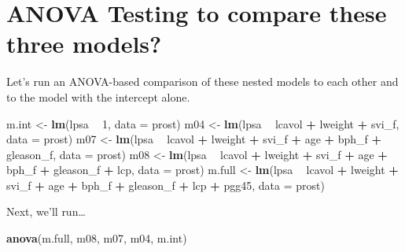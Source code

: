 \documentclass[]{book}
\newenvironment{Shaded}{\begin{snugshade}}{\end{snugshade}}
\newcommand{\KeywordTok}[1]{\textcolor[rgb]{0.13,0.29,0.53}{\textbf{#1}}}
\newcommand{\DataTypeTok}[1]{\textcolor[rgb]{0.13,0.29,0.53}{#1}}
\newcommand{\DecValTok}[1]{\textcolor[rgb]{0.00,0.00,0.81}{#1}}
\newcommand{\StringTok}[1]{\textcolor[rgb]{0.31,0.60,0.02}{#1}}
\newcommand{\OperatorTok}[1]{\textcolor[rgb]{0.81,0.36,0.00}{\textbf{#1}}}
\newcommand{\NormalTok}[1]{#1}
\theoremstyle{definition}
\theoremstyle{definition}
\theoremstyle{definition}
\theoremstyle{remark}
\begin{document}
\section{ANOVA Testing to compare these three
models?}\label{anova-testing-to-compare-these-three-models}

Let's run an ANOVA-based comparison of these nested models to each other
and to the model with the intercept alone.

\begin{Shaded}
\begin{Highlighting}[]
\NormalTok{m.int <-}\StringTok{ }\KeywordTok{lm}\NormalTok{(lpsa }\OperatorTok{~}\StringTok{ }\DecValTok{1}\NormalTok{, }\DataTypeTok{data =}\NormalTok{ prost)}
\NormalTok{m04 <-}\StringTok{ }\KeywordTok{lm}\NormalTok{(lpsa }\OperatorTok{~}\StringTok{ }\NormalTok{lcavol }\OperatorTok{+}\StringTok{ }\NormalTok{lweight }\OperatorTok{+}\StringTok{ }\NormalTok{svi_f, }\DataTypeTok{data =}\NormalTok{ prost)}
\NormalTok{m07 <-}\StringTok{ }\KeywordTok{lm}\NormalTok{(lpsa }\OperatorTok{~}\StringTok{ }\NormalTok{lcavol }\OperatorTok{+}\StringTok{ }\NormalTok{lweight }\OperatorTok{+}\StringTok{ }\NormalTok{svi_f }\OperatorTok{+}\StringTok{ }
\StringTok{              }\NormalTok{age }\OperatorTok{+}\StringTok{ }\NormalTok{bph_f }\OperatorTok{+}\StringTok{ }\NormalTok{gleason_f, }\DataTypeTok{data =}\NormalTok{ prost)}
\NormalTok{m08 <-}\StringTok{ }\KeywordTok{lm}\NormalTok{(lpsa }\OperatorTok{~}\StringTok{ }\NormalTok{lcavol }\OperatorTok{+}\StringTok{ }\NormalTok{lweight }\OperatorTok{+}\StringTok{ }\NormalTok{svi_f }\OperatorTok{+}\StringTok{ }
\StringTok{              }\NormalTok{age }\OperatorTok{+}\StringTok{ }\NormalTok{bph_f }\OperatorTok{+}\StringTok{ }\NormalTok{gleason_f }\OperatorTok{+}\StringTok{ }\NormalTok{lcp, }\DataTypeTok{data =}\NormalTok{ prost)}
\NormalTok{m.full <-}\StringTok{ }\KeywordTok{lm}\NormalTok{(lpsa }\OperatorTok{~}\StringTok{ }\NormalTok{lcavol }\OperatorTok{+}\StringTok{ }\NormalTok{lweight }\OperatorTok{+}\StringTok{ }\NormalTok{svi_f }\OperatorTok{+}\StringTok{ }
\StringTok{              }\NormalTok{age }\OperatorTok{+}\StringTok{ }\NormalTok{bph_f }\OperatorTok{+}\StringTok{ }\NormalTok{gleason_f }\OperatorTok{+}\StringTok{ }\NormalTok{lcp }\OperatorTok{+}\StringTok{ }\NormalTok{pgg45, }\DataTypeTok{data =}\NormalTok{ prost)}
\end{Highlighting}
\end{Shaded}

Next, we'll run\ldots{}

\begin{Shaded}
\begin{Highlighting}[]
\KeywordTok{anova}\NormalTok{(m.full, m08, m07, m04, m.int)}
\end{Highlighting}
\end{Shaded}
\end{document}
